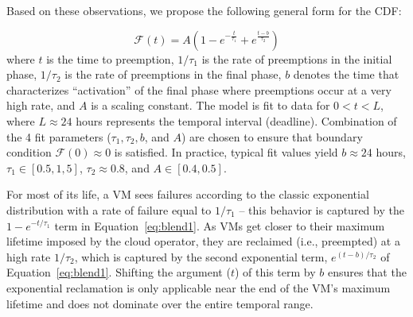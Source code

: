 Based on these observations, we propose the following general form for the CDF:

\vspace*{\subsecspace}
\begin{equation}
  \label{eq:blend1}
  \boxed{
  \mathscr{F}\left(t\right) = A\left(1-e^{-\frac{t}{\tau_1}} + e^{\frac{t-b}{\tau_2}}\right)}
  \end{equation}
\noindent where $t$ is the time to preemption, $1/\tau_1$ is the rate of preemptions in the initial phase, $1/\tau_2$ is the rate of preemptions in the final phase, $b$ denotes the time that characterizes ``activation'' of the final phase where preemptions occur at a very high rate, and $A$ is a scaling constant. 
%
The model is fit to data for $0 < t < L$, where $L \approx 24$ hours represents the temporal interval (deadline).
Combination of the 4 fit parameters ($\tau_1, \tau_2, b$, and $A$) are chosen to ensure that boundary condition $\mathscr{F}(0) \approx 0$ is satisfied.
In practice, typical fit values yield $b \approx 24$ hours, $\tau_1 \in [0.5, 1,5] $, $\tau_2 \approx 0.8$, and $A \in [0.4, 0.5]$.






For most of its life, a VM sees failures according to the classic exponential distribution with a rate of failure equal to $1/\tau_1$ -- this behavior is captured by the $1-e^{-t/\tau_1}$ term in Equation~\ref{eq:blend1}. 
As VMs get closer to their maximum lifetime imposed by the cloud operator, they are reclaimed (i.e., preempted) at a high rate $1/\tau_2$, which is captured by the second exponential term, $e^{(t-b)/\tau_2}$ of Equation~\ref{eq:blend1}. 
Shifting the argument ($t$) of this term by $b$ ensures that the exponential reclamation is only applicable near the end of the VM's maximum lifetime and does not dominate over the entire temporal range. 

